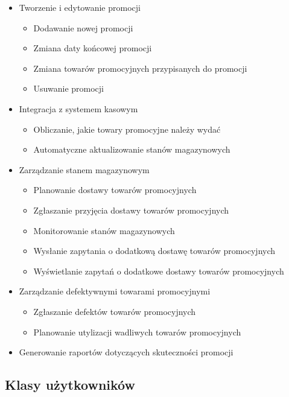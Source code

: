 \documentclass[a4paper,12pt]{article}
\begin{document}
\begin{itemize}
    \item Tworzenie i edytowanie promocji
    \begin{itemize}
        \item Dodawanie nowej promocji
        \item Zmiana daty końcowej promocji
        \item Zmiana towarów promocyjnych przypisanych do promocji
        \item Usuwanie promocji
    \end{itemize}
    \item Integracja z systemem kasowym
    \begin{itemize}
        \item Obliczanie, jakie towary promocyjne należy wydać
        \item Automatyczne aktualizowanie stanów magazynowych
    \end{itemize}
    \item Zarządzanie stanem magazynowym
    \begin{itemize}
        \item Planowanie dostawy towarów promocyjnych
        \item Zgłaszanie przyjęcia dostawy towarów promocyjnych
        \item Monitorowanie stanów magazynowych
        \item Wysłanie zapytania o dodatkową dostawę towarów promocyjnych
        \item Wyświetlanie zapytań o dodatkowe dostawy towarów promocyjnych
    \end{itemize}
    \item Zarządzanie defektywnymi towarami promocyjnymi
    \begin{itemize}
        \item Zgłaszanie defektów towarów promocyjnych
        \item Planowanie utylizacji wadliwych towarów promocyjnych
    \end{itemize}
    \item Generowanie raportów dotyczących skuteczności promocji
\end{itemize}

\subsection{Klasy użytkowników}
\end{document}
